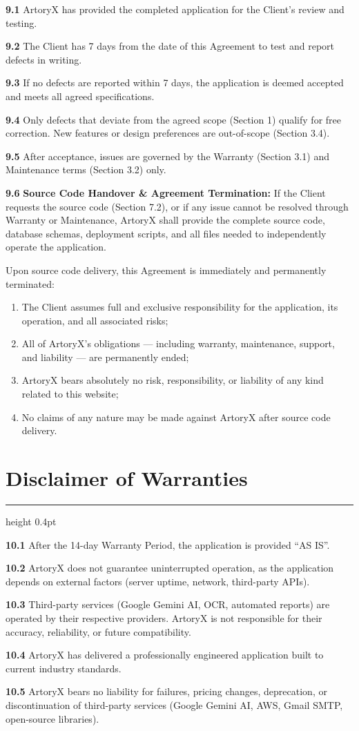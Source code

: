 \documentclass[a4paper, 11pt]{article}
\newcommand{\sectionrule}{%
  {\color{bordergray}\hrule height 0.4pt}%
  \vspace{5pt}%
}
\newcommand{\clausenum}[1]{%
  {\color{accent}\textbf{#1}}\;%
}
\begin{document}
{\small
\clausenum{9.1} ArtoryX has provided the completed application for the Client's review and testing.

\clausenum{9.2} The Client has 7 days from the date of this Agreement to test and report defects in writing.

\clausenum{9.3} If no defects are reported within 7 days, the application is deemed accepted and meets all agreed specifications.

\clausenum{9.4} Only defects that deviate from the agreed scope (Section 1) qualify for free correction. New features or design preferences are out-of-scope (Section 3.4).

\clausenum{9.5} After acceptance, issues are governed by the Warranty (Section 3.1) and Maintenance terms (Section 3.2) only.

\clausenum{9.6}\textbf{Source Code Handover \& Agreement Termination:}
If the Client requests the source code (Section 7.2), or if any issue cannot be resolved through Warranty or Maintenance, ArtoryX shall provide the complete source code, database schemas, deployment scripts, and all files needed to independently operate the application.

Upon source code delivery, this Agreement is immediately and permanently terminated:
\begin{enumerate}
  \item The Client assumes full and exclusive responsibility for the application, its operation, and all associated risks;
  \item All of ArtoryX's obligations --- including warranty, maintenance, support, and liability --- are permanently ended;
  \item ArtoryX bears absolutely no risk, responsibility, or liability of any kind related to this website;
  \item No claims of any nature may be made against ArtoryX after source code delivery.
\end{enumerate}
}


\section{Disclaimer of Warranties}
\sectionrule

{\small
\clausenum{10.1} After the 14-day Warranty Period, the application is provided ``AS IS''.

\clausenum{10.2} ArtoryX does not guarantee uninterrupted operation, as the application depends on external factors (server uptime, network, third-party APIs).

\clausenum{10.3} Third-party services (Google Gemini AI, OCR, automated reports) are operated by their respective providers. ArtoryX is not responsible for their accuracy, reliability, or future compatibility.

\clausenum{10.4} ArtoryX has delivered a professionally engineered application built to current industry standards.

\clausenum{10.5} ArtoryX bears no liability for failures, pricing changes, deprecation, or discontinuation of third-party services (Google Gemini AI, AWS, Gmail SMTP, open-source libraries).
}
\end{document}
